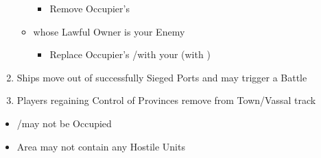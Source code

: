 \documentclass[10pt]{article}
\begin{document}
\begin{enumerate}
\begin{itemize}
		\begin{itemize}
			\item Remove Occupier's \town
		\end{itemize}
		\item {} whose Lawful Owner is your Enemy
		\begin{itemize}
			\item Replace Occupier's \town/\rebeltown with your \town (with \unrest)
		\end{itemize}
	\end{itemize}
	\vfill
	\item Ships move out of successfully Sieged Ports and may trigger a Battle
	\item Players regaining Control of Provinces remove \cubes from Town/Vassal track
\end{enumerate}

\begin{itemize}
	\item \town/\vassal may not be Occupied
	\item Area may not contain any Hostile Units
\end{itemize}
\end{document}
